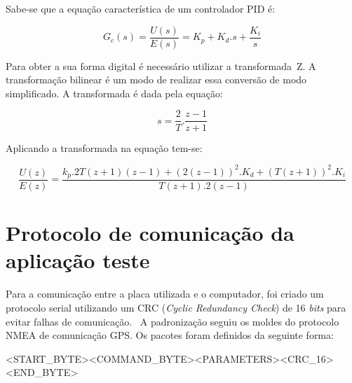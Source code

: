 \documentclass[12pt,openright,oneside,a4paper,brazil]{abntex2}
\begin{document}
Sabe-se que a equação característica de um controlador PID é:

\begin{equation}
        G_{c}(s) = \frac{U(s)}{E(s)} = K_{p} + K_{d}.s + \frac{K_{i}}{s} 
\end{equation}

Para obter a sua forma digital é necessário utilizar a transformada~Z. A transformação bilinear é um modo de realizar essa conversão de modo simplificado. A transformada  é dada pela equação:

\begin{equation}
        s = \frac{2}{T} .\frac{z-1}{z+1}
\end{equation}

Aplicando a transformada na equação tem-se:

\begin{equation}
	\frac{U(z)}{E(z)} = \frac{k_{p}.2T(z+1)(z-1) + (2(z-1))^{2} . K_{d} + (T(z+1))^{2} . K_{i}}{T(z+1).2(z-1)} 
\end{equation}

\chapter{Protocolo de comunicação da aplicação teste}\label{chap:protocolo}

Para a comunicação entre a placa utilizada e o computador, foi criado um protocolo serial utilizando um CRC (\textit{Cyclic Redundancy Check}) de 16 \textit{bits} para evitar falhas de comunica\c{c}\~ao. \ A padronização seguiu os moldes do protocolo NMEA de comunicação GPS. Os pacotes foram definidos da seguinte forma:

\begin{center}
\textsf{{
{{\textless}START\_BYTE{\textgreater}{\textless}COMMAND\_BYTE{\textgreater}{\textless}PARAMETERS{\textgreater}{\textless}CRC\_16{\textgreater}{\textless}END\_BYTE{\textgreater}}
}}
\end{center}
\end{document}

